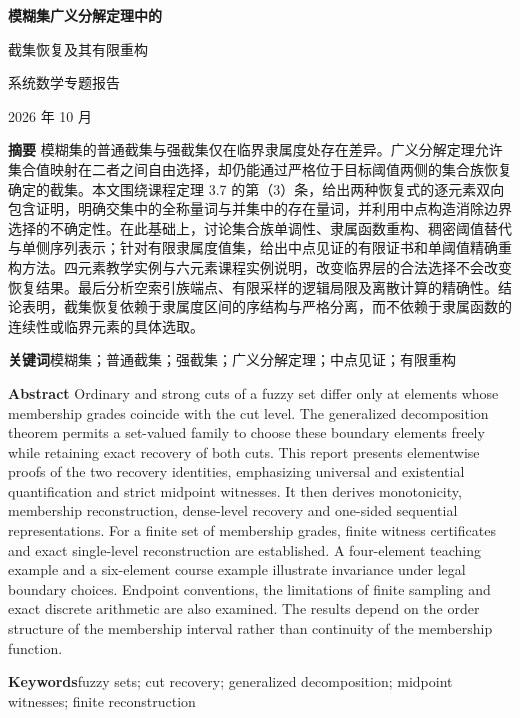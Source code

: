 \documentclass[UTF8,fontset=fandol,zihao=-4,a4paper]{ctexart}
\numberwithin{equation}{section}
\theoremstyle{reportplain}
\begin{document}
\begin{center}
{\LARGE\bfseries 模糊集广义分解定理中的\par 截集恢复及其有限重构\par}
\vspace{9pt}
{\normalsize 系统数学专题报告}\par
\vspace{6pt}
{\small 2026 年 10 月}
\end{center}
\vspace{5pt}
\noindent\textbf{摘要}\quad
模糊集的普通截集与强截集仅在临界隶属度处存在差异。广义分解定理允许集合值映射在二者之间自由选择，却仍能通过严格位于目标阈值两侧的集合族恢复确定的截集。本文围绕课程定理 3.7 的第（3）条，给出两种恢复式的逐元素双向包含证明，明确交集中的全称量词与并集中的存在量词，并利用中点构造消除边界选择的不确定性。在此基础上，讨论集合族单调性、隶属函数重构、稠密阈值替代与单侧序列表示；针对有限隶属度值集，给出中点见证的有限证书和单阈值精确重构方法。四元素教学实例与六元素课程实例说明，改变临界层的合法选择不会改变恢复结果。最后分析空索引族端点、有限采样的逻辑局限及离散计算的精确性。结论表明，截集恢复依赖于隶属度区间的序结构与严格分离，而不依赖于隶属函数的连续性或临界元素的具体选取。

\vspace{5pt}
\noindent\textbf{关键词}\quad 模糊集；普通截集；强截集；广义分解定理；中点见证；有限重构

\vspace{10pt}
\noindent\textbf{Abstract}\quad
Ordinary and strong cuts of a fuzzy set differ only at elements whose membership grades coincide with the cut level. The generalized decomposition theorem permits a set-valued family to choose these boundary elements freely while retaining exact recovery of both cuts. This report presents elementwise proofs of the two recovery identities, emphasizing universal and existential quantification and strict midpoint witnesses. It then derives monotonicity, membership reconstruction, dense-level recovery and one-sided sequential representations. For a finite set of membership grades, finite witness certificates and exact single-level reconstruction are established. A four-element teaching example and a six-element course example illustrate invariance under legal boundary choices. Endpoint conventions, the limitations of finite sampling and exact discrete arithmetic are also examined. The results depend on the order structure of the membership interval rather than continuity of the membership function.

\noindent\textbf{Keywords}\quad fuzzy sets; cut recovery; generalized decomposition; midpoint witnesses; finite reconstruction
\end{document}
